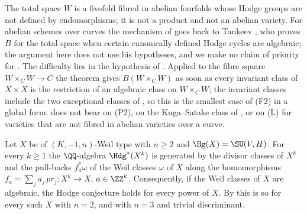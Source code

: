 \begin{remark}\label{rem:newlefschetzscope}
The total space $W$ is a fivefold fibred in abelian fourfolds whose Hodge
groups are not defined by endomorphisms; it is not a product and not an
abelian variety. For abelian schemes over curves the mechanism of
 goes back to Tankeev \cite{Tan03}, who proves $B$
for the total space when certain canonically defined Hodge cycles are
algebraic; the argument here does not use his hypotheses, and we make no
claim of priority for . The difficulty lies in the hypothesis of
.
Applied to the fibre square $W\times_{C}W\to C$ the theorem gives
$B(W\times_{C}W)$ as soon as every invariant class of $X\times X$ is the
restriction of an algebraic class on $W\times_{C}W$; the invariant classes
include the two exceptional classes of , so this
is the smallest case of (F2) in a global form.  does not bear on (P2), on the Kuga--Satake
class of , or on \textup{(L)} for varieties that are not
fibred in abelian varieties over a curve.
\end{remark}

\begin{proposition}\label{prop:powers}
Let $X$ be of $(K,-1,n)$-Weil type with $n\ge2$ and $\Hg(X)=\SU(V,H)$. For
every $k\ge1$ the $\QQ$-algebra $\Hdg^{*}(X^{k})$ is generated by the divisor
classes of $X^{k}$ and the pull-backs $f_{a}^{*}\omega$ of the Weil classes
$\omega$ of $X$ along the homomorphisms $f_{a}=\sum_{j}a_{j}\,pr_{j}\colon
X^{k}\to X$, $a\in\ZZ^{k}$. Consequently, if the Weil classes of $X$ are
algebraic, the Hodge conjecture holds for every power of $X$. By
\cite{Mar25a} this is so for every such $X$ with $n=2$, and with $n=3$ and
trivial discriminant.
\end{proposition}

